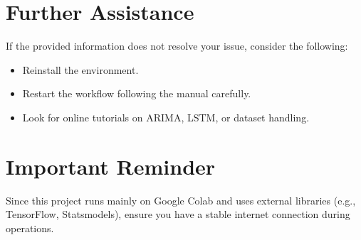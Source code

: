 \section*{Further Assistance}
If the provided information does not resolve your issue, consider the following:
\begin{itemize}
	\item Reinstall the environment.
	\item Restart the workflow following the manual carefully.
	\item Look for online tutorials on ARIMA, LSTM, or dataset handling.
\end{itemize}

\section*{Important Reminder}
Since this project runs mainly on Google Colab and uses external libraries (e.g., TensorFlow, Statsmodels), ensure you have a stable internet connection during operations.








